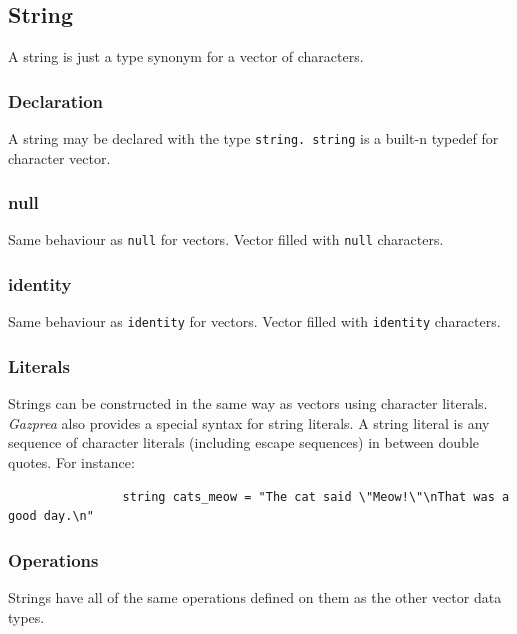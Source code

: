 \documentclass{article}
\begin{document}
	\subsection{String}\label{sec:string}

		A string is just a type synonym for a vector of characters.

		\subsubsection{Declaration}

			A string may be declared with the type \texttt{string. string} is a built-n typedef for character vector.

		\subsubsection{null}

			Same behaviour as \texttt{null} for vectors. Vector filled with \texttt{null} characters.

		\subsubsection{identity}

			Same behaviour as \texttt{identity} for vectors. Vector filled with \texttt{identity} characters.

		\subsubsection{Literals}

			Strings can be constructed in the same way as vectors using character literals.  \textit{Gazprea} also
			provides a special syntax for string literals. A string literal is any sequence of character literals
			(including escape sequences) in between double quotes. For instance:

			\begin{lstlisting}
				string cats_meow = "The cat said \"Meow!\"\nThat was a good day.\n"
			\end{lstlisting}

		\subsubsection{Operations}

			Strings have all of the same operations defined on them as the other vector data types.
\end{document}
